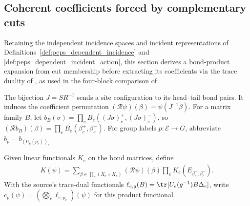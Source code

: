 \subsection{Coherent coefficients forced by complementary cuts}
\label{sec:peps_dependent_bond_support}

Retaining the independent incidence spaces and incident representations of
Definitions~\ref{def:peps_dependent_incidence} and
\ref{def:peps_dependent_incident_action}, this section derives a bond-product
expansion from cut membership before extracting its coefficients via the
trace duality of \cite[Lemma~4.6]{Schuch2010PEPS}, as used in the
four-block comparison of \cite[Theorem~5.5]{Schuch2010PEPS}.

\begin{definition}%
    \label{def:peps_dependent_bond_product}
    \leanok
    The bijection $J=SR^{-1}$ sends a site configuration to its head--tail
    bond pairs. It induces the coefficient permutation
    $(\mathcal R\psi)(\beta)=\psi(J^{-1}\beta)$.
    For a matrix family $B$, let
    $b_B(\sigma)=\prod_eB_e((J\sigma)_e^+,(J\sigma)_e^-)$, so
    $(\mathcal Rb_B)(\beta)=\prod_eB_e(\beta_e^+,\beta_e^-)$.
    For group labels $p:\mathcal E\to G$, abbreviate
    $b_p=b_{(U_e(p_e))_e}$.
\end{definition}

\begin{definition}%
    \label{def:peps_dependent_bond_coefficient}
    \leanok
    Given linear functionals $K_e$ on the bond matrices, define
    \begin{align}
        K(\psi)=\sum_{\beta\in\prod_e(X_e\times X_e)}
        (\mathcal R\psi)(\beta)\prod_eK_e(E_{\beta_e^+,\beta_e^-}).
        \label{eq:peps_dependent_bond_pairing}
    \end{align}
    With the source's trace-dual functionals
    $\ell_{e,g}(B)=\tr[U_e(g^{-1})B\Delta_e]$, write
    $c_p(\psi)=(\bigotimes_e\ell_{e,p_e})(\psi)$ for this product functional.
\end{definition}

